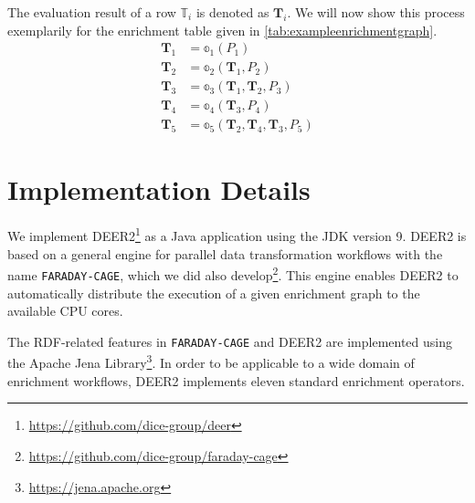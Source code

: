 The evaluation result of a row $\mathbb{T}_i$ is denoted as $\mathbf{T}_i$.
We will now show this process exemplarily for the enrichment table given in \autoref{tab:exampleenrichmentgraph}.
\begin{equation*}
\begin{aligned}
  \mathbf{T}_1 & = \mathbb{o}_1\left(P_1\right) \\
  \mathbf{T}_2 & = \mathbb{o}_2\left(\mathbf{T}_1, P_2\right) \\
  \mathbf{T}_3 & = \mathbb{o}_3\left(\mathbf{T}_1, \mathbf{T}_2, P_3\right) \\
  \mathbf{T}_4 & = \mathbb{o}_4\left(\mathbf{T}_3, P_4\right) \\
  \mathbf{T}_5 & = \mathbb{o}_5\left(\mathbf{T}_2, \mathbf{T}_4, \mathbf{T}_3, P_5\right)
  \end{aligned}
\end{equation*}
%


\section{Implementation Details}
\label{sec:impl}

We implement \ac{DEER2}\footnote{\url{https://github.com/dice-group/deer}} as a Java application using the \ac{JDK} version 9.
\ac{DEER2} is based on a general engine for parallel data transformation workflows with the name \texttt{FARADAY-CAGE}, which we did also develop\footnote{\url{https://github.com/dice-group/faraday-cage}}.
This engine enables \ac{DEER2} to automatically distribute the execution of a given enrichment graph to the available CPU cores.

The \ac{RDF}-related features in \texttt{FARADAY-CAGE} and \ac{DEER2} are implemented using the Apache Jena Library\footnote{\url{https://jena.apache.org}}.
In order to be applicable to a wide domain of enrichment workflows, \ac{DEER2} implements eleven standard enrichment operators.

